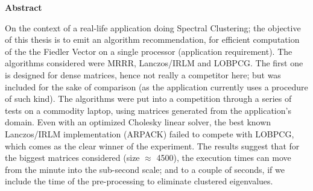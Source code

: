 \thispagestyle{plain}
\begin{center}

  \vspace{0.4cm}


  \vspace{0.9cm}
  \textbf{Abstract}
\end{center}

    On the context of a real-life application doing Spectral
    Clustering; the objective of this thesis is to emit an algorithm
    recommendation, for efficient 
    computation of the the Fiedler Vector on a single processor
    (application requirement). The algorithms considered were
    MRRR, Lanczos/IRLM and LOBPCG. The first one is designed for dense
    matrices, hence not really a competitor here; but was 
    included for the sake of comparison (as the application currently
    uses a procedure of such kind). The algorithms were put into
    a competition through a series of tests on a commodity laptop, 
    using matrices generated from the application's domain. Even with
    an optimized Cholesky linear solver, the best known Lanczos/IRLM
    implementation (ARPACK) failed to compete with LOBPCG, which comes
    as the clear winner of the experiment. The results suggest that
    for the biggest matrices considered (size $\approx$ 4500), the
    execution times can 
    move from the minute into the sub-second scale; and to a couple of
    seconds, if we include the time of the pre-processing to eliminate
    clustered eigenvalues. 
